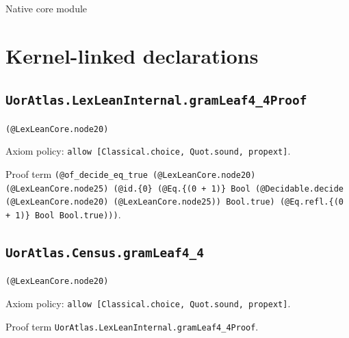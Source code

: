 \documentclass[11pt]{article}
\begin{document}
\begin{center}{\LARGE Native core module}\end{center}
\section*{Kernel-linked declarations}
\subsection*{\texttt{UorAtlas.LexLeanInternal.gramLeaf4\_4Proof}}
\noindent\texttt{(@LexLeanCore.node20)}\par
\noindent Axiom policy: \texttt{allow [Classical.choice, Quot.sound, propext]}.\par
\noindent Proof term \texttt{(@of\_decide\_eq\_true (@LexLeanCore.node20) (@LexLeanCore.node25) (@id.\{0\} (@Eq.\{(0 + 1)\} Bool (@Decidable.decide (@LexLeanCore.node20) (@LexLeanCore.node25)) Bool.true) (@Eq.refl.\{(0 + 1)\} Bool Bool.true)))}.\par
\subsection*{\texttt{UorAtlas.Census.gramLeaf4\_4}}
\noindent\texttt{(@LexLeanCore.node20)}\par
\noindent Axiom policy: \texttt{allow [Classical.choice, Quot.sound, propext]}.\par
\noindent Proof term \texttt{UorAtlas.LexLeanInternal.gramLeaf4\_4Proof}.\par
\end{document}
